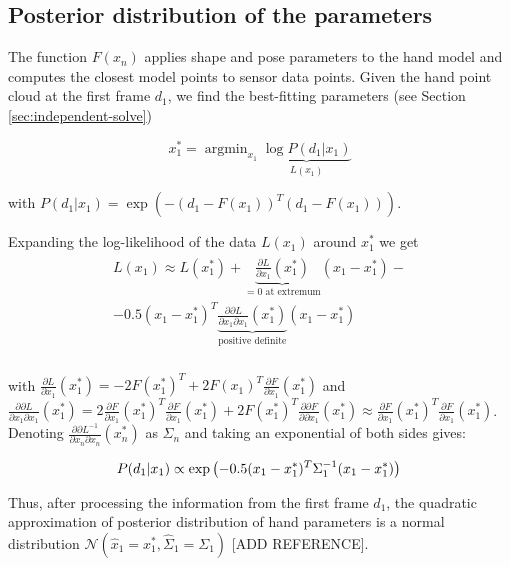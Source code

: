 \documentclass[10pt,twocolumn,letterpaper]{article}
\begin{document}
\subsection {Posterior distribution of the parameters} \label{sec:posterior}

The function $F(x_n)$ applies shape and pose parameters to the hand model and computes the closest model points to sensor data points. 
Given the hand point cloud at the first frame $d_1$, we find the best-fitting parameters (see Section \ref{sec:independent-solve})

\begin{equation}
x^*_1 = \operatorname{argmin}_{x_1} \underbrace{\log  P(d_1|x_1)}_{L(x_1)} \label{eq:independent}
\end{equation}

with $P(d_1|x_1) = \exp \left( - (d_1 - F(x_1))^T (d_1 - F(x_1)) \right)$.

Expanding the log-likelihood of the data $L(x_1)$ around $x_1^*$ we get
\begin{align}
\begin{split}
 L(x_1) \approx L(x_1^*) + \underbrace{\frac{\partial L}{\partial x_1}(x_1^*)}_{= 0 \text{ at extremum}}(x_1 - x_1^*) - \\
- 0.5(x_1 - x_1^*)^T \underbrace{\frac{\partial \partial L}{\partial x_1 \partial x_1}(x_1^*) }_{\text{positive definite}}  (x_1 - x_1^*) \\
\end{split}
\end{align}

with $\frac{\partial L}{\partial x_1}(x_1^*) = - 2 F(x_1^*)^T + 2 F(x_1)^T \frac{\partial F}{\partial x_1}(x_1^*)  $ and 
$\frac{\partial \partial L}{\partial x_1 \partial x_1}(x_1^*) = 2  \frac{\partial F}{\partial x_1}(x_1^*)^T  \frac{\partial F}{\partial x_1}(x_1^*) + 2 F(x_1^*)^T  \frac{\partial \partial F}{\partial \partial x_1}(x_1^*)  \approx  \frac{\partial F}{\partial x_1}(x_1^*)^T  \frac{\partial F}{\partial x_1}(x_1^*)$. Denoting $\frac{\partial \partial L^{-1}}{\partial x_n \partial x_n}(x_n^*) $ as $\Sigma_n$ and taking an exponential of both sides gives:
\vspace{-2em}

\begin{equation}
P(d_1|x_1) \propto \exp\left(- 0.5(x_1 - x_1^*)^T \Sigma_1^{-1}  (x_1 - x_1^*) \right)\\
\end{equation}

Thus, after processing the information from the first frame $d_1$, the quadratic approximation of posterior distribution of hand parameters is a normal distribution $\mathcal{N}\left(\hat{x}_1 = x_1^*,  \hat{\Sigma}_1 = \Sigma_1 \right)$ [ADD REFERENCE].
\end{document}
